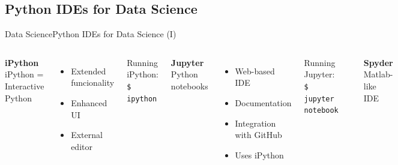 \documentclass[10pt,compress]{beamer} %
\begin{document}
\subsection{Python IDEs for Data Science}
\begin{frame}{Data Science}{Python IDEs for Data Science (I)}
    \begin{columns}
	   \centering \textbf{iPython}\\
	   iPython = Interactive Python
   		\begin{itemize}
		\item Extended funcionality
		\item Enhanced UI
		\item External editor
		\end{itemize}

		Running iPython:\\
		\texttt{\$ ipython}

	   \centering \textbf{Jupyter}\\
		Python notebooks
	\begin{itemize}
		\item Web-based IDE
		\item Documentation
		\item Integration with GitHub
		\item Uses iPython
	\end{itemize}

		Running Jupyter:\\
		\texttt{\$ jupyter notebook}

		\includegraphics[width=0.8\textwidth]{figs/jupyter.png}	

	   \centering \textbf{Spyder}\\
		Matlab-like IDE

		\includegraphics[width=0.8\textwidth]{figs/spyder-ide.png}	


\end{columns}
\end{frame}
\end{document}
